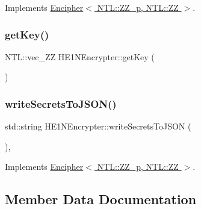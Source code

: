 Implements \hyperlink{classEncipher_aaf8138eb280608bfd03c6eb762ffc010}{Encipher$<$ N\+T\+L\+::\+Z\+Z\+\_\+p, N\+T\+L\+::\+Z\+Z $>$}.

\mbox{\label{classHE1NEncrypter_a68735a56be50d13e04824e48a61fc2f8}} 
\subsubsection{\texorpdfstring{get\+Key()}{getKey()}}
{\footnotesize\ttfamily N\+T\+L\+::vec\+\_\+\+ZZ H\+E1\+N\+Encrypter\+::get\+Key (\begin{DoxyParamCaption}{ }\end{DoxyParamCaption})}

\mbox{\label{classHE1NEncrypter_ad1bca3e0933b8e15b91d208e421f83b2}} 
\subsubsection{\texorpdfstring{write\+Secrets\+To\+J\+S\+O\+N()}{writeSecretsToJSON()}}
{\footnotesize\ttfamily std\+::string H\+E1\+N\+Encrypter\+::write\+Secrets\+To\+J\+S\+ON (\begin{DoxyParamCaption}{ }\end{DoxyParamCaption})\hspace{0.3cm}{\ttfamily [override]}, {\ttfamily [virtual]}}



Implements \hyperlink{classEncipher_a27d3efa1e364c1f0d7def65454c61b85}{Encipher$<$ N\+T\+L\+::\+Z\+Z\+\_\+p, N\+T\+L\+::\+Z\+Z $>$}.



\subsection{Member Data Documentation}
\mbox{\label{classHE1NEncrypter_a6ae3f5e69318587ba70afc87d21e6e11}} 
